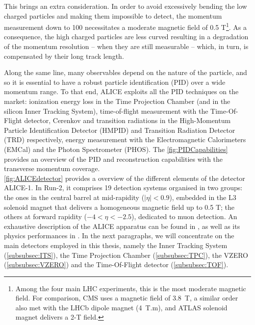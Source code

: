 This brings an extra consideration. In order to avoid excessively bending the low \pT charged particles and making them impossible to detect, the momentum measurement down to 100 \mmom necessitates a moderate magnetic field of 0.5 T\footnote{Among the four main LHC experiments, this is the most moderate magnetic field. For comparison, CMS uses a magnetic field of 3.8~T, a similar order also met with the LHCb dipole magnet (4~T.m), and ATLAS solenoid magnet delivers a 2-T field.}. As a consequence, the high \pT charged particles are less curved resulting in a degradation of the momentum resolution -- when they are still measurable -- which, in turn, is compensated by their long track length.

Along the same line, many observables depend on the nature of the particle, and so it is essential to have a robust particle identification (PID) over a wide momentum range. To that end, ALICE exploits all the PID techniques on the market: ionization energy loss in the Time Projection Chamber (and in the silicon Inner Tracking System), time-of-flight measurement with the Time-Of-Flight detector, Cerenkov and transition radiations in the High-Momentum Particle Identification Detector (HMPID) and Transition Radiation Detector (TRD) respectively, energy measurement with the Electromagnetic Calorimeters (EMCal) and the Photon Spectrometer (PHOS). The \fig\ref{fig:PIDCapabilities} provides an overview of the PID and reconstruction capabilities with the transverse momentum coverage.\\


\Fig\ref{fig:ALICEdetector} provides a overview of the different elements of the detector ALICE-1. In Run-2, it comprises 19 detection systems organised in two groups: the ones in the central barrel at mid-rapidity ($|\eta| < 0.9$), embedded in the L3 solenoid magnet that delivers a homogeneous magnetic field up to 0.5 T; the others at forward rapidity ($-4 < \eta < -2.5$), dedicated to muon detection. An exhaustive description of the ALICE apparatus can be found in \cite{alicecollaborationALICEExperimentCERN2008}, as well as its physics performances in \cite{carminatiALICEPhysicsPerformance2004}\cite{alicecollaborationALICEPhysicsPerformance2006}\cite{alicecollaborationPerformanceALICEExperiment2014}. In the next paragraphs, we will concentrate on the main detectors employed in this thesis, namely the Inner Tracking System (\Sec\ref{subsubsec:ITS}), the Time Projection Chamber (\Sec\ref{subsubsec:TPC}), the VZERO (\Sec\ref{subsubsec:VZERO}) and the Time-Of-Flight detector (\Sec\ref{subsubsec:TOF}).

